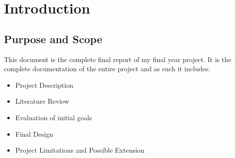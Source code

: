 
\section{Introduction} %



\subsection{Purpose and Scope} %

This document is the complete final report of my final year project. It is the complete
documentation of the entire project and as such it includes:

\begin{itemize} 
    \item Project Description
    \item Literature Review
    \item Evaluation of initial goals
    \item Final Design
    \item Project Limitations and Possible Extension
\end{itemize}

